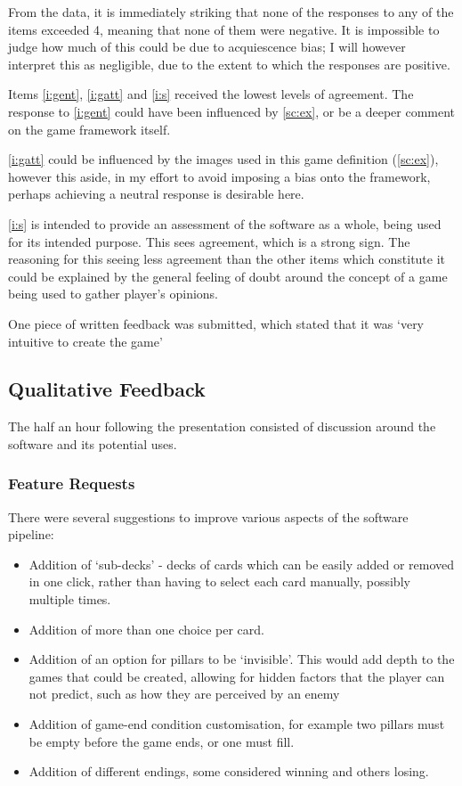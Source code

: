 From the data, it is immediately striking that none of the responses to any of the items exceeded 4, meaning that none of them were negative. It is impossible to judge how much of this could be due to acquiescence bias; I will however interpret this as negligible, due to the extent to which the responses are positive.

Items \ref{i:gent}, \ref{i:gatt} and \ref{i:s} received the lowest levels of agreement. The response to \ref{i:gent} could have been influenced by \ref{sc:ex}, or be a deeper comment on the game framework itself. 

\ref{i:gatt} could be influenced by the images used in this game definition (\ref{sc:ex}), however this aside, in my effort to avoid imposing a bias onto the framework, perhaps achieving a neutral response is desirable here.

\ref{i:s} is intended to provide an assessment of the software as a whole, being used for its intended purpose. This sees agreement, which is a strong sign. The reasoning for this seeing less agreement than the other items which constitute it could be explained by the general feeling of doubt around the concept of a game being used to gather player's opinions.

One piece of written feedback was submitted, which stated that it was `very intuitive to create the game'

\subsection{Qualitative Feedback}
The half an hour following the presentation consisted of discussion around the software and its potential uses.

\subsubsection{Feature Requests}
There were several suggestions to improve various aspects of the software pipeline:

\begin{itemize}
    \item Addition of `sub-decks' - decks of cards which can be easily added or removed in one click, rather than having to select each card manually, possibly multiple times. 
    \item Addition of more than one choice per card.
    \item Addition of an option for pillars to be `invisible'. This would add depth to the games that could be created, allowing for hidden factors that the player can not predict, such as how they are perceived by an enemy
    \item Addition of game-end condition customisation, for example two pillars must be empty before the game ends, or one must fill.
    \item Addition of different endings, some considered winning and others losing.
\end{itemize}

